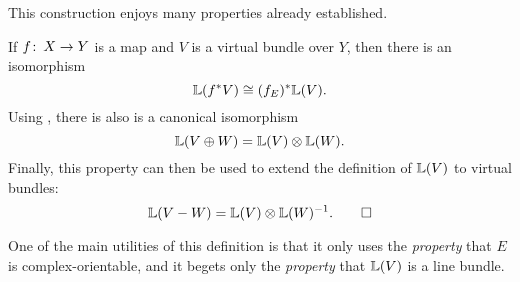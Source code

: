 This construction enjoys many properties already established.
\begin{corollary}
If $f \colon\thinspace X \to Y$ is a map and $V$ is a virtual bundle over $Y$, then there is an isomorphism \[\mathbb{L}(f^* V) \cong (f_E)^* \mathbb{L}(V).\]  Using , there is also is a canonical isomorphism \[\mathbb{L}(V \oplus W) = \mathbb{L}(V) \otimes \mathbb{L}(W).\]  Finally, this property can then be used to extend the definition of $\mathbb{L}(V)$ to virtual bundles: \[\mathbb{L}(V - W) = \mathbb{L}(V) \otimes \mathbb{L}(W)^{-1}. \qed\]
\end{corollary}

\begin{remark}
One of the main utilities of this definition is that it only uses the \emph{property} that $E$ is complex-orientable, and it begets only the \emph{property} that $\mathbb{L}(V)$ is a line bundle.
\end{remark}

